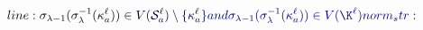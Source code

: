 \documentclass[12pt]{article}
\begin{document}
\makeatletter
\renewcommand*{\@textcolor}[3]{%
  \protect\leavevmode
  \begingroup
    \color#1{#2}#3%
  \endgroup
}
\makeatother
\begin{displaymath}
\mathcolor[RGB]{0,0,15}{line:
\sigma_{\lambda-1}(\sigma_{\lambda}^{-1}(\kappa_a^\ell))} \mathcolor[RGB]{0,0,30}{\in} \mathcolor[RGB]{0,0,45}{V(\mathcal{S}_a^\ell)} \mathcolor[RGB]{0,0,60}{\setminus} \mathcolor[RGB]{0,0,75}{\{\kappa_a^\ell} \mathcolor[RGB]{0,0,90}{\}} \mathcolor[RGB]{0,0,105}{\text{} \mathcolor[RGB]{0,0,120}{and} } \mathcolor[RGB]{0,0,135}{\sigma_{\lambda-1}(\sigma_{\lambda}^{-1}(\kappa^{\ell}_a))} \mathcolor[RGB]{0,0,150}{\in} \mathcolor[RGB]{0,0,165}{V(\K^\ell)

norm_str:}
\end{displaymath}
\end{document}
